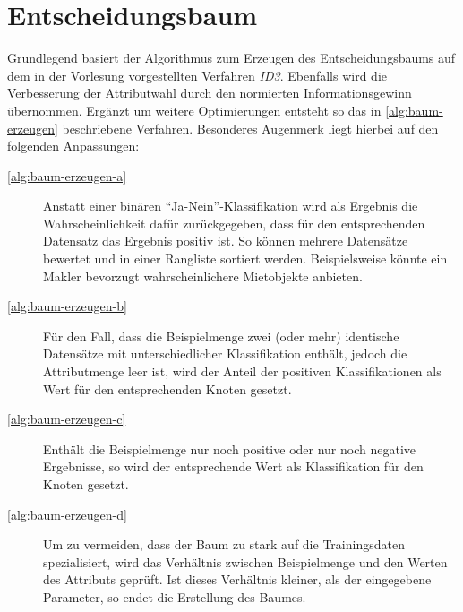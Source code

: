 \newpage
\section{Entscheidungsbaum}\label{sec:entscheidungsbaum}
Grundlegend basiert der Algorithmus zum Erzeugen des Entscheidungsbaums auf dem
in der Vorlesung vorgestellten Verfahren \emph{ID3}.
Ebenfalls wird die Verbesserung der Attributwahl durch den normierten Informationsgewinn übernommen.
Ergänzt um weitere Optimierungen entsteht so das in \autoref{alg:baum-erzeugen} beschriebene Verfahren.
Besonderes Augenmerk liegt hierbei auf den folgenden Anpassungen:
\begin{description}
    \item[\autoref{alg:baum-erzeugen-a}] Anstatt einer binären \enquote{Ja-Nein}-Klassifikation wird als Ergebnis die Wahrscheinlichkeit dafür zurückgegeben,
                    dass für den entsprechenden Datensatz das Ergebnis positiv ist.
                    So können mehrere Datensätze bewertet und in einer Rangliste sortiert werden.
                    Beispielsweise könnte ein Makler bevorzugt wahrscheinlichere Mietobjekte anbieten.
    \item[\autoref{alg:baum-erzeugen-b}] Für den Fall, dass die Beispielmenge zwei (oder mehr) identische Datensätze mit unterschiedlicher Klassifikation enthält,
    jedoch die Attributmenge leer ist, wird der Anteil der positiven Klassifikationen als Wert für den entsprechenden Knoten gesetzt.
    \item[\autoref{alg:baum-erzeugen-c}] Enthält die Beispielmenge nur noch positive oder nur noch negative Ergebnisse,
        so wird der entsprechende Wert als Klassifikation für den Knoten gesetzt.
    \item[\autoref{alg:baum-erzeugen-d}] Um zu vermeiden, dass der Baum zu stark auf die Trainingsdaten spezialisiert,
        wird das Verhältnis zwischen Beispielmenge und den Werten des Attributs geprüft.
        Ist dieses Verhältnis kleiner, als der eingegebene Parameter, so endet die Erstellung des Baumes.

\end{description}

